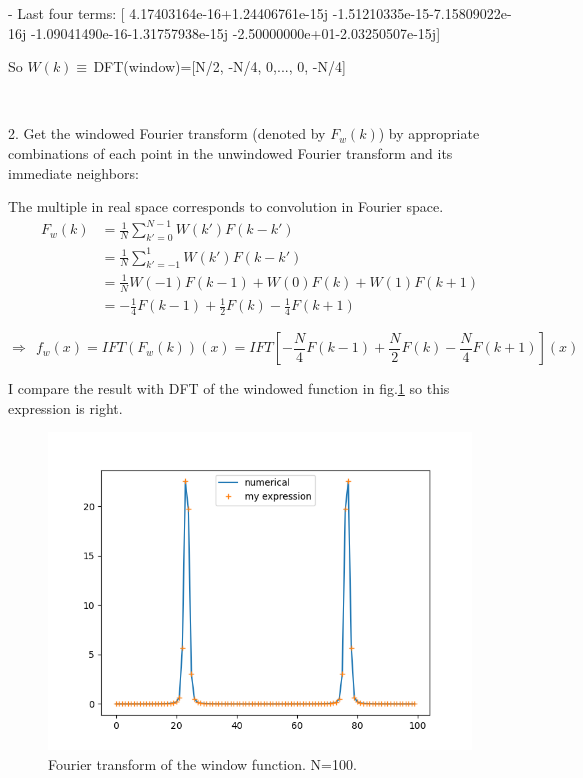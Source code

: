 \documentclass[showpacs, oneside, onecolumn, prl, amsmath, amssymb, nofootinbib, superscriptaddress, notitlepage]{revtex4-1}
\newcommand\bas{\begin{align*}}
\newcommand\bfig{\begin{figure}}
\newcommand\efig{\end{figure}}
\begin{document}
- Last four terms: [ 4.17403164e-16+1.24406761e-15j -1.51210335e-15-7.15809022e-16j
 -1.09041490e-16-1.31757938e-15j -2.50000000e+01-2.03250507e-15j]

So $W(k)\equiv\,$DFT(window)=[N/2, -N/4, 0,..., 0, -N/4]

~~~~

2. Get the windowed Fourier transform (denoted by $F_w(k)$) by appropriate combinations of each point in the unwindowed Fourier transform and its immediate neighbors:

The multiple in real space corresponds to convolution in Fourier space.
\bas
F_w(k)&=\frac1N\sum_{k'=0}^{N-1}W(k')F(k-k')\\
&=\frac1N\sum_{k'=-1}^1 W(k')F(k-k')\\
&=\frac1NW(-1)F(k-1)+W(0)F(k)+W(1)F(k+1)\\
&=-\frac14 F(k-1)+\frac12 F(k)-\frac14 F(k+1)
\end{align*}

$$\Rightarrow\ \ f_w(x)=IFT(F_w(k))(x)=IFT\left[-\frac N4 F(k-1)+\frac N2 F(k)-\frac N4 F(k+1)\right](x)$$

I compare the result with DFT of the windowed function in fig.\ref{4-5-5-2} so this expression is right.

\bfig
	\centering
	\includegraphics[scale=0.85]{4-5-5-2.png}
	\caption{Fourier transform of the window function. N=100.}
	\label{4-5-5-2}
\efig
\end{document}
